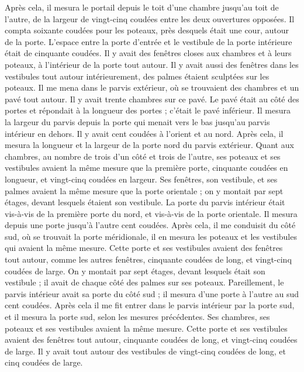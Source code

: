 \begin{multicols}{2}
Après cela, il mesura le portail depuis le toit d'une chambre jusqu'au toit de l'autre, de la largeur de vingt-cinq coudées entre les deux ouvertures opposées.
Il compta soixante coudées pour les poteaux, près desquels était une cour, autour de la porte.
L’espace entre la porte d’entrée et le vestibule de la porte intérieure était de cinquante coudées.
Il y avait des fenêtres closes aux chambres et à leurs poteaux, à l’intérieur de la porte tout autour. Il y avait aussi des fenêtres dans les vestibules tout autour intérieurement, des palmes étaient sculptées sur les poteaux.
Il me mena dans le parvis extérieur, où se trouvaient des chambres et un pavé tout autour. Il y avait trente chambres sur ce pavé.
Le pavé était au côté des portes et répondait à la longueur des portes ; c’était le pavé inférieur.
Il mesura la largeur du parvis depuis la porte qui menait vers le bas jusqu’au parvis intérieur en dehors. Il y avait cent coudées à l'orient et au nord.
Après cela, il mesura la longueur et la largeur de la porte nord du parvis extérieur.
Quant aux chambres, au nombre de trois d’un côté et trois de l’autre, ses poteaux et ses vestibules avaient la même mesure que la première porte, cinquante coudées en longueur, et vingt-cinq coudées en largeur.
Ses fenêtres, son vestibule, et ses palmes avaient la même mesure que la porte orientale ; on y montait par sept étages, devant lesquels étaient son vestibule.
La porte du parvis intérieur était vis-à-vis de la première porte du nord, et vis-à-vis de la porte orientale. Il mesura depuis une porte jusqu’à l'autre cent coudées.
Après cela, il me conduisit du côté sud, où se trouvait la porte méridionale, il en mesura les poteaux et les vestibules qui avaient la même mesure.
Cette porte et ses vestibules avaient des fenêtres tout autour, comme les autres fenêtres, cinquante coudées de long, et vingt-cinq coudées de large.
On y montait par sept étages, devant lesquels était son vestibule ; il avait de chaque côté des palmes sur ses poteaux.
Pareillement, le parvis intérieur avait sa porte du côté sud ; il mesura d’une porte à l’autre au sud cent coudées.
Après cela il me fit entrer dans le parvis intérieur par la porte sud, et il mesura la porte sud, selon les mesures précédentes.
Ses chambres, ses poteaux et ses vestibules avaient la même mesure. Cette porte et ses vestibules avaient des fenêtres tout autour, cinquante coudées de long, et vingt-cinq coudées de large.
Il y avait tout autour des vestibules de vingt-cinq coudées de long, et cinq coudées de large.

\end{multicols}
